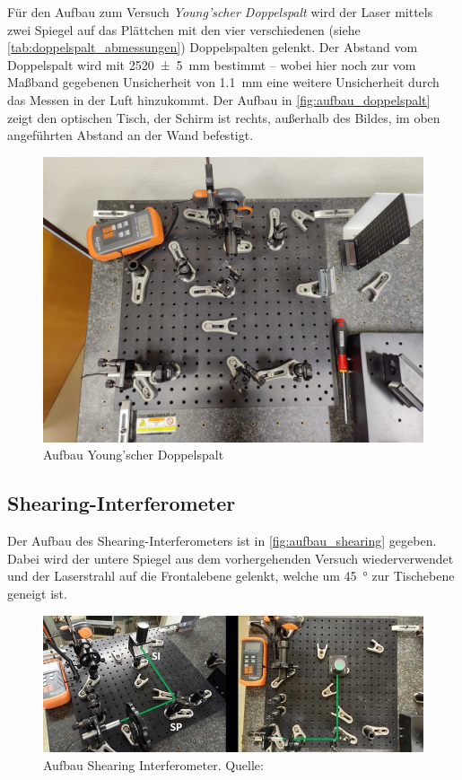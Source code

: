 \documentclass[ngerman]{scrartcl}
\begin{document}
Für den Aufbau zum Versuch \textit{Young'scher Doppelspalt} wird der Laser mittels zwei Spiegel auf das Plättchen mit den vier verschiedenen (siehe \autoref{tab:doppelspalt_abmessungen}) Doppelspalten gelenkt. Der Abstand vom Doppelspalt wird mit \SI{2520(5)}{\milli\meter} bestimmt -- wobei hier noch zur vom Maßband gegebenen Unsicherheit von \SI{1.1}{\milli\meter} eine weitere Unsicherheit durch das Messen in der Luft hinzukommt. Der Aufbau in \autoref{fig:aufbau_doppelspalt} zeigt den optischen Tisch, der Schirm ist rechts, außerhalb des Bildes, im oben angeführten Abstand an der Wand befestigt.
%
\begin{figure}[H]
    \centering
    \begin{samepage}
        \includegraphics[width=0.7\linewidth]{fig/Compressed/aufbau_doppelspalt.jpg}
        \caption{Aufbau Young'scher Doppelspalt}
        \label{fig:aufbau_doppelspalt}
    \end{samepage}
\end{figure}


\subsection{Shearing-Interferometer}
\label{sec:aufbau_shearing}

Der Aufbau des Shearing-Interferometers ist in \autoref{fig:aufbau_shearing} gegeben. Dabei wird der untere Spiegel aus dem vorhergehenden Versuch wiederverwendet und der Laserstrahl auf die Frontalebene gelenkt, welche um \SI{45}{\degree} zur Tischebene geneigt ist.
%
\begin{figure}[H]
    \centering
    \begin{samepage}
        \includegraphics[width=0.9\linewidth]{fig/Compressed/shearing.jpg}
        \caption[Aufbau Shearing Interferometer]{Aufbau Shearing Interferometer. Quelle: \cite{ref:angabe}}
        \label{fig:aufbau_shearing}
    \end{samepage}
\end{figure}
%
\end{document}
